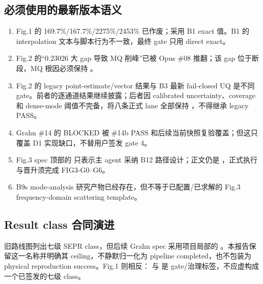 \subsection{必须使用的最新版本语义}

\begin{enumerate}
  \item Fig.1 的 169.7\%/167.7\%/2275\%/2453\% 已作废；采用 B1 exact 值。B1 的 interpolation 文本与脚本行为不一致，最终 gate 只用 direct exact。
  \item Fig.2 的“0.23026 大 gap 导致 MQ 削峰”已被 Opus \#08 推翻；该 gap 位于断段，MQ 根因必须保持 。
  \item Fig.2 的 legacy point-estimate/vector 结果与 B3 最新 fail-closed UQ 是不同 gate。前者的逐通道结果继续披露；后者因 calibrated uncertainty、coverage 和 dense-mode 阈值不完备，将八条正式 lane 全部保持 ，不得继承 legacy PASS。
  \item Grahn \#14 的 BLOCKED 被 \#14b PASS 和后续当前快照复验覆盖；但这只覆盖 D1 实现缺口，不替用户签发 gate 4。
  \item Fig.3 spec 顶部的  只表示主 agent 采纳 B12 路径设计；正文仍是 ，正式执行与晋升须完成 FIG3-G0--G6。
  \item B9s mode-analysis 研究产物已经存在，但不等于已配置/已求解的 Fig.3 frequency-domain scattering template。
\end{enumerate}

\subsection{Result class 合同演进}

旧路线图列出七级 SEPR class，但后续 Grahn spec 采用项目局部的 。本报告保留这一名称并明确其 ceiling，不静默归一化为 pipeline completed，也不包装为 physical reproduction success。Fig.1 则相反： 与  是 gate/治理标签，不应虚构成一个已签发的七级 class。
